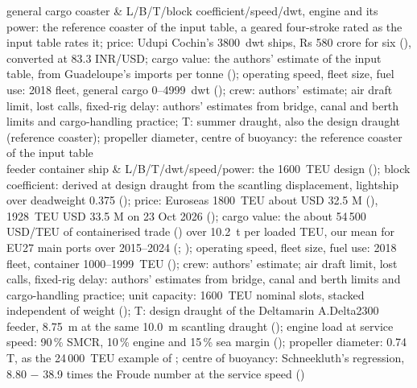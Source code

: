 general cargo coaster & L/B/T/block coefficient/speed/dwt, engine and its power: the reference coaster of the input table, a geared four-stroke rated as the input table rates it; price: Udupi Cochin's \num{3800}~dwt ships, Rs 580 crore for six (\citealp{onmanorama2023udupi}), converted at 83.3 INR/USD; cargo value: the authors' estimate of the input table, from Guadeloupe's imports per tonne (\citealp{iedom2025guadeloupe}); operating speed, fleet size, fuel use: 2018 fleet, general cargo 0--4999~dwt (\citealp[Table 35]{faber2020}); crew: authors' estimate; air draft limit, lost calls, fixed-rig delay: authors' estimates from bridge, canal and berth limits and cargo-handling practice; T: summer draught, also the design draught (reference coaster); propeller diameter, centre of buoyancy: the reference coaster of the input table \\
feeder container ship & L/B/T/dwt/speed/power: the \num{1600}~TEU design (\citealp[Table 19]{man2024container}); block coefficient: derived at design draught from the scantling displacement, lightship over deadweight 0.375 (\citealp[Table 1.01]{man2011}); price: Euroseas \num{1800}~TEU about USD 32.5 M (\citealp{euroseas2026feeder}), \num{1928}~TEU USD 33.5 M on 23 Oct 2026 (\citealp[p. 7]{allied2026}); cargo value: the about 54\,500 USD/TEU of containerised trade (\citealp{rodrigue2024porteconomics}) over 10.2~t per loaded TEU, our mean for EU27 main ports over 2015--2024 (\citealp{eurostat_mar_mg_am_cwhc}; \citealp{eurostat_mar_mg_am_cvh}); operating speed, fleet size, fuel use: 2018 fleet, container 1000--1999~TEU (\citealp[Table 35]{faber2020}); crew: authors' estimate; air draft limit, lost calls, fixed-rig delay: authors' estimates from bridge, canal and berth limits and cargo-handling practice; unit capacity: \num{1600}~TEU nominal slots, stacked independent of weight (\citealp[Table 19, p. 8]{man2024container}); T: design draught of the Deltamarin A.Delta2300 feeder, 8.75~m at the same 10.0~m scantling draught (\citealp{marinelink2015_adelta2300}); engine load at service speed: 90\,\% SMCR, 10\,\% engine and 15\,\% sea margin (\citealp[Table 19]{man2024container}); propeller diameter: 0.74 T, as the 24\,000~TEU example of \citet{man2011}; centre of buoyancy: Schneekluth's regression, 8.80 \ensuremath{-} 38.9 times the Froude number at the service speed (\citealp[slide 16]{ventura_estimation}) \\
